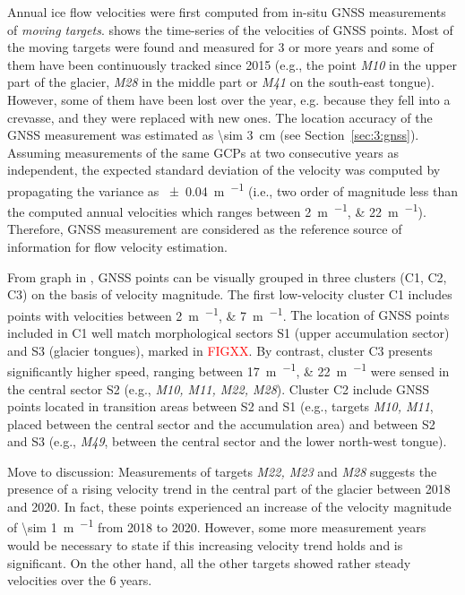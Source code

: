 Annual ice flow velocities were first computed from in-situ GNSS measurements of \textit{moving targets}.
 shows the time-series of the velocities of GNSS points. 
Most of the moving targets were found and measured for 3 or more years and some of them have been continuously tracked since 2015 (e.g., the point \textit{M10} in the upper part of the glacier, \textit{M28} in the middle part or \textit{M41} on the south-east tongue). 
However, some of them have been lost over the year, e.g. because they fell into a crevasse, and they were replaced with new ones. 
The location accuracy of the GNSS measurement was estimated as \qty{\sim 3}{\centi\meter} (see Section~\ref{sec:3:gnss}). 
Assuming measurements of the same GCPs at two consecutive years as independent,
the expected standard deviation of the velocity was computed by propagating the variance as \qty{\pm 0.04}{\meter\per\year} (i.e., two order of magnitude less than the computed annual velocities which ranges between \qtylist{2;22}{\meter\per\year}).
Therefore, GNSS measurement are considered as the reference source of information for flow velocity estimation.

From graph in , GNSS points can be visually grouped in three clusters (C1, C2, C3) on the basis of velocity magnitude. 
The first low-velocity cluster C1 includes points with velocities between  \qtylist{2;7}{\meter\per\year}. 
{\color{red}
The location of GNSS points included in C1 well match morphological sectors S1 (upper accumulation sector) and S3 (glacier tongues), marked in \textcolor{red}{FIGXX}.
By contrast, cluster C3 presents significantly higher speed, ranging between \qtylist{17;22}{\meter\per\year} were sensed in the central sector S2 (e.g., \textit{M10, M11, M22, M28}).
Cluster C2 include GNSS points located in transition areas between S2 and S1 (e.g., targets \textit{M10, M11}, placed between the central sector and the accumulation area) and between S2 and S3 (e.g., \textit{M49}, between the central sector and the lower north-west tongue).
}

{\color{red} Move to discussion: 
Measurements of targets \textit{M22, M23} and \textit{M28} suggests the presence of a rising velocity trend in the central part of the glacier between 2018 and 2020. 
In fact, these points experienced an increase of the velocity magnitude of \qty{\sim 1}{\meter\per\year} from 2018 to 2020.
However, some more measurement years would be necessary to state if this increasing velocity trend holds and is significant. 
On the other hand, all the other targets showed rather steady velocities over the 6 years.
}

